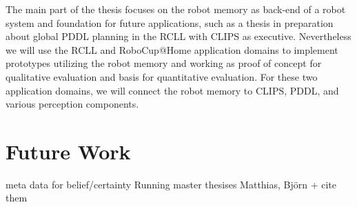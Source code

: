 The main part of the thesis focuses on the robot memory as back-end of
a robot system and foundation for future applications, such as a
thesis in preparation about global PDDL planning in the RCLL with
CLIPS as executive. Nevertheless we will use the RCLL and RoboCup@Home
application domains to implement prototypes utilizing the robot memory
and working as proof of concept for qualitative evaluation and basis
for quantitative evaluation. For these two application domains, we
will connect the robot memory to CLIPS, PDDL, and various perception
components.

\section{Future Work}
\label{sec:future-work}

meta data for belief/certainty
Running master thesises Matthias, Björn + cite them